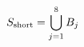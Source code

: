 \documentclass[preview]{standalone}
\begin{document}
\begin{align*}
\special{dvisvgm:raw <g id='unique000'>}S_{\mathrm{short}}=\bigcup_{j=1}^{8}B_j\special{dvisvgm:raw </g>}
\end{align*}
\end{document}
